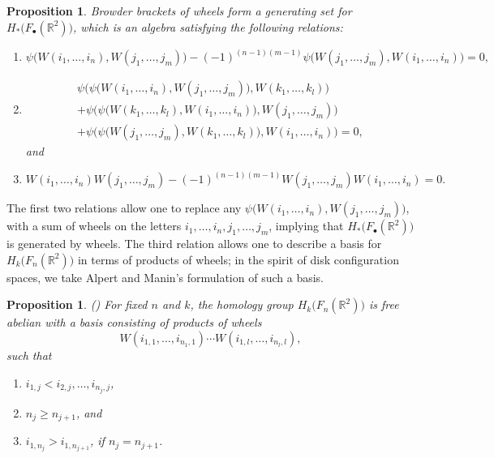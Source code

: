 \documentclass[pagebackref,colorlinks,citecolor=blue,linkcolor=blue,urlcolor=blue,filecolor=blue]{article}
\newtheorem{prop}[thm]{Proposition}
\theoremstyle{definition}\newtheorem{definition}[thm]{Definition}
\theoremstyle{definition}
\newcommand{\R}{\ensuremath{\mathbb{R}}}
\begin{document}
\begin{prop}\label{little cube operad structure}
\cite[Proposition 2.7, Definition 2.9, and Theorem 4.9]{sinha2006homology}
Browder brackets of wheels form a generating set for $H_{*}\big(F_{\bullet}(\R^{2})\big)$, which is an algebra satisfying the following relations:
\begin{enumerate}
 \item \[
\psi\big(W(i_{1},\dots, i_{n}), W(j_{1},\dots, j_{m})\big)-(-1)^{(n-1)(m-1)}\psi\big(W(j_{1},\dots, j_{m}), W(i_{1},\dots, i_{n})\big)=0,
\]
    \item \begin{multline*}
\psi\Big(\psi\big(W(i_{1},\dots, i_{n}), W(j_{1},\dots, j_{m})\big), W(k_{1},\dots, k_{l})\Big)\\
+\psi\Big(\psi\big(W(k_{1},\dots, k_{l}), W(i_{1},\dots, i_{n})\big), W(j_{1},\dots, j_{m})\Big)\\
+\psi\Big(\psi\big(W(j_{1},\dots, j_{m}), W(k_{1},\dots, k_{l})\big), W(i_{1},\dots, i_{n})\Big)=0,
\end{multline*}
and
    \item \[
W(i_{1},\dots, i_{n})W(j_{1},\dots, j_{m})-(-1)^{(n-1)(m-1)}W(j_{1},\dots, j_{m})W(i_{1},\dots, i_{n})=0.
\]

\end{enumerate}
\end{prop}

The first two relations allow one to replace any $\psi\big(W(i_{1},\dots, i_{n}), W(j_{1},\dots, j_{m})\big)$, with a sum of wheels on the letters $i_{1},\dots, i_{n}, j_{1},\dots, j_{m}$, implying that $H_{*}\big(F_{\bullet}(\R^{2})\big)$ is generated by wheels.
The third relation allows one to describe a basis for $H_{k}\big(F_{n}(\R^{2})\big)$ in terms of products of wheels; in the spirit of disk configuration spaces, we take Alpert and Manin's formulation of such a basis.

\begin{prop}\label{basis for homology of FnR2}
(\cite[Theorem B]{alpert2021configuration1}) For fixed $n$ and $k$, the homology group $H_{k}\big(F_{n}(\R^{2})\big)$ is free abelian with a basis consisting of products of wheels
\[
W(i_{1,1}, \dots, i_{n_{1}, 1})\cdots W(i_{1,l}, \dots, i_{n_{l}, l}),
\]
such that
\begin{enumerate}
    \item $i_{1, j}<i_{2,j}, \dots, i_{n_{j},j}$, 
    \item $n_{j}\ge n_{j+1}$, and 
    \item $i_{1, n_{j}}>i_{1, n_{j+1}}$, if $n_{j}=n_{j+1}$.
\end{enumerate}
\end{prop}
\end{document}

